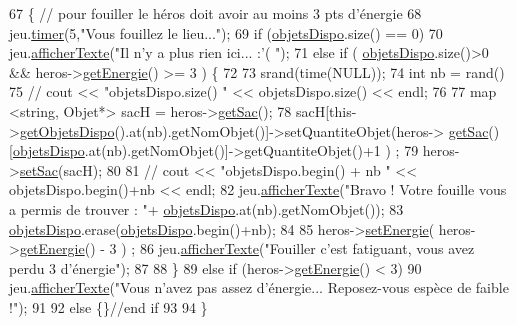 \begin{DoxyCode}
67                                              \{  \textcolor{comment}{// pour fouiller le héros doit avoir au moins 3 pts
       d'énergie}
68         jeu.\hyperlink{class_jeu_a52ce4fb6c415b45209db13a589c9d675}{timer}(5,\textcolor{stringliteral}{"Vous fouillez le lieu..."});
69         \textcolor{keywordflow}{if} (\hyperlink{class_lieu_a3a65fbb8ecba3f2e265905730ad2e631}{objetsDispo}.size() == 0)
70             jeu.\hyperlink{class_jeu_aa09fb40439f16b9665a0d76679f78e4e}{afficherTexte}(\textcolor{stringliteral}{"Il n'y a plus rien ici... :'( "});
71         \textcolor{keywordflow}{else} \textcolor{keywordflow}{if} ( \hyperlink{class_lieu_a3a65fbb8ecba3f2e265905730ad2e631}{objetsDispo}.size()>0 && heros->\hyperlink{class_heros_ae9bbef6d2edcb8b14d9ec3854146a42c}{getEnergie}() >= 3 ) \{
72 
73             srand(time(NULL));
74             \textcolor{keywordtype}{int} nb = rand() %
75 \textcolor{comment}{//          cout << "objetsDispo.size() " << objetsDispo.size() << endl;}
76 
77             map <string, Objet*> sacH = heros->\hyperlink{class_heros_a62d8b172e82dbb0a1d2c23da21bdb069}{getSac}();
78             sacH[this->\hyperlink{class_lieu_ad4fbedc5d8b53c0b79684aa34c6700b8}{getObjetsDispo}().at(nb).getNomObjet()]->setQuantiteObjet(heros->
      \hyperlink{class_heros_a62d8b172e82dbb0a1d2c23da21bdb069}{getSac}()[\hyperlink{class_lieu_a3a65fbb8ecba3f2e265905730ad2e631}{objetsDispo}.at(nb).getNomObjet()]->getQuantiteObjet()+1 ) ;
79             heros->\hyperlink{class_heros_a7d6d86388fe81deca1c5688ed07b2167}{setSac}(sacH);
80 
81         \textcolor{comment}{//  cout << "objetsDispo.begin() + nb " << objetsDispo.begin()+nb << endl;}
82             jeu.\hyperlink{class_jeu_aa09fb40439f16b9665a0d76679f78e4e}{afficherTexte}(\textcolor{stringliteral}{"Bravo ! Votre fouille vous a permis de trouver : "}+
      \hyperlink{class_lieu_a3a65fbb8ecba3f2e265905730ad2e631}{objetsDispo}.at(nb).getNomObjet());
83             \hyperlink{class_lieu_a3a65fbb8ecba3f2e265905730ad2e631}{objetsDispo}.erase(\hyperlink{class_lieu_a3a65fbb8ecba3f2e265905730ad2e631}{objetsDispo}.begin()+nb);
84             
85             heros->\hyperlink{class_heros_a5d4f5d3d3a4db451923f0609a3e1b53c}{setEnergie}( heros->\hyperlink{class_heros_ae9bbef6d2edcb8b14d9ec3854146a42c}{getEnergie}() - 3 ) ;
86             jeu.\hyperlink{class_jeu_aa09fb40439f16b9665a0d76679f78e4e}{afficherTexte}(\textcolor{stringliteral}{"Fouiller c'est fatiguant, vous avez perdu 3 d'énergie"});
87 
88         \}
89         \textcolor{keywordflow}{else} \textcolor{keywordflow}{if} (heros->\hyperlink{class_heros_ae9bbef6d2edcb8b14d9ec3854146a42c}{getEnergie}() < 3)
90             jeu.\hyperlink{class_jeu_aa09fb40439f16b9665a0d76679f78e4e}{afficherTexte}(\textcolor{stringliteral}{"Vous n'avez pas assez d'énergie... Reposez-vous espèce de
       faible !"});
91 
92         \textcolor{keywordflow}{else} \{\}\textcolor{comment}{//end if}
93         
94     \}
\end{DoxyCode}
